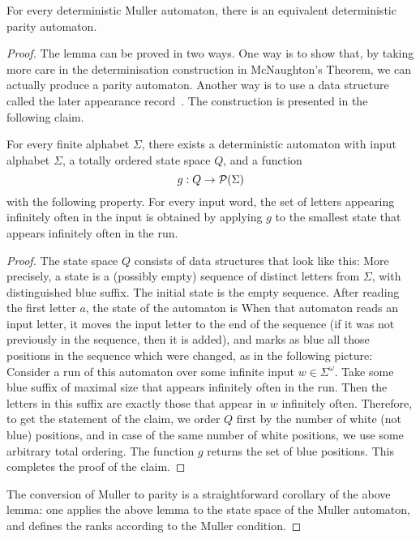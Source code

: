 \begin{lemma}\label{lem:muller-to-parity}
For every deterministic Muller automaton, there is an equivalent deterministic parity automaton.
\end{lemma}
\begin{proof}
The lemma can be proved in two ways. One way is to show that, by taking more care in the determinisation construction in McNaughton's Theorem, we can actually produce a parity automaton. Another way is to use  a data structure called the later appearance record~\cite{Gurevich:1982kx}. The construction is presented in the following claim.

\begin{claim}
For every finite alphabet $\Sigma$, there exists a deterministic automaton with input alphabet $\Sigma$, a totally ordered state space $Q$, and a function $$g : Q \to {\cal P}(\Sigma)$$ with the following property. For every input word, the set of letters appearing infinitely often in the input is obtained by applying $g$ to the smallest state that appears infinitely often in the run.	
\end{claim}
\begin{proof}The state space $Q$ consists of data structures that look like this:
More precisely, a state is a (possibly empty) sequence of distinct letters from $\Sigma$, with distinguished blue suffix. The initial state is the empty sequence.  After reading the first letter $a$, the state of the automaton is 
When that automaton reads an input letter, it moves the input letter to the end of the sequence (if it was not previously in the sequence, then it is added), and marks as blue all those positions in the sequence which were changed, as in the following picture:
Consider a run of this automaton over some infinite input $w \in \Sigma^\omega$. Take some blue suffix of maximal size that appears infinitely often in the run. Then the letters in this suffix are exactly those that appear in $w$ infinitely often.
Therefore, to get the statement of the claim, we order $Q$ first by the number of white (not blue) positions, and in case of the same number of white positions, we use some arbitrary total ordering. The function $g$ returns the set of blue positions. This completes the proof of the claim.
\end{proof}

The conversion of Muller to parity is a straightforward corollary of the above lemma: one applies the above lemma to the state space of the Muller automaton, and defines the ranks according to the Muller condition. 
\end{proof}


